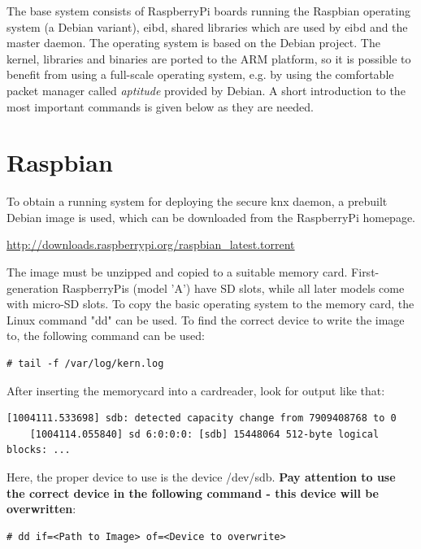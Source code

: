 The base system consists of RaspberryPi boards running the Raspbian operating system (a Debian variant), \gls{eibd}, shared libraries which
are used by \gls{eibd} and the master daemon.
The operating system is based on the Debian project. The kernel, libraries and binaries are ported to the ARM platform, so it is possible to benefit from
using a full-scale operating system, e.g. by using the comfortable packet manager called
\textit{aptitude} provided by Debian. A short introduction to the most important commands is given below as they are needed.

\section{Raspbian}

To obtain a running system for deploying the secure \gls{knx} daemon, a prebuilt Debian image is used, which can be downloaded from the RaspberryPi homepage.

\url{http://downloads.raspberrypi.org/raspbian_latest.torrent}

The image must be unzipped and copied to a suitable memory card. First-generation RaspberryPis (model 'A') have SD slots, while
all later models come with micro-SD slots. To copy the basic operating system to the memory card, the Linux command "dd" can
be used. To find the correct device to write the image to, the following command can be used: 

\begin{lstlisting}[style=BashInputStyle,label=lst:kern.log]
    # tail -f /var/log/kern.log
\end{lstlisting}

After inserting the memorycard into a cardreader, look for output like that:

\begin{lstlisting}[style=BashInputStyle]
    [1004111.533698] sdb: detected capacity change from 7909408768 to 0
    [1004114.055840] sd 6:0:0:0: [sdb] 15448064 512-byte logical blocks: ...
\end{lstlisting}

Here, the proper device to use is the device /dev/sdb.
\textbf{Pay attention to use the correct device in the following command - this device will be overwritten}:

\begin{lstlisting}[style=BashInputStyle]
    # dd if=<Path to Image> of=<Device to overwrite>
\end{lstlisting}

